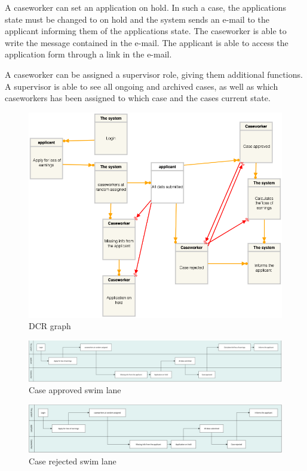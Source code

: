 A caseworker can set an application on hold. In such a case, the applications state must be changed to on hold and the system sends an e-mail to the applicant informing them of the applications state. The caseworker is able to write the message contained in the e-mail. The applicant is able to access the application form through a link in the e-mail.

\vspace{2mm}

A caseworker can be assigned a supervisor role, giving them additional functions. A supervisor is able to see all ongoing and archived cases, as well as which caseworkers has been assigned to which case and the cases current state.
\newpage
\begin{figure}[htb!]
	\includegraphics[width=\textwidth]{img/dcrgraph.png}
	\caption{DCR graph}
\end{figure}

\newpage
\begin{figure}[htb!]
    \centering
    \includegraphics[width=\textwidth]{img/swim-case-approved.png}
    \caption{Case approved swim lane}
\end{figure}

\begin{figure}[htb!]
    \centering
    \includegraphics[width=\textwidth]{img/swim-case-rejected.png}
    \caption{Case rejected swim lane}
\end{figure}
